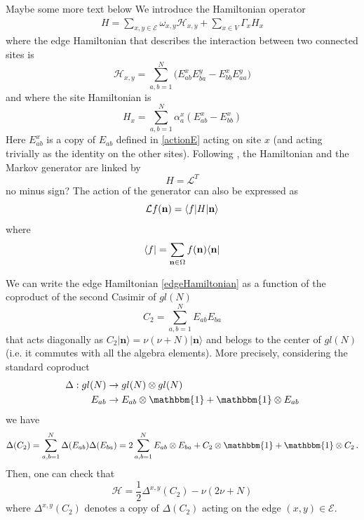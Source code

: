 \documentclass[10pt]{article}
\numberwithin{equation}{section}
\numberwithin{equation}{subsection}
\newcommand{\twoj}{\nu}
\begin{document}
{\color{red}Maybe some more text below}
We introduce the Hamiltonian operator
\begin{equation}\label{OriginalHamiltonian}
	\begin{split}
		H=\sum_{x,y\in \mathcal{E}}\omega_{x,y}\mathcal{H}_{x,y}+\sum_{x\in V}\Gamma_{x}H_{x}
	\end{split}
\end{equation}
where the edge Hamiltonian that describes the interaction between two connected sites is
\begin{equation}\label{edgeHamiltonian}
\mathcal{H}_{x,y}=\sum_{a,b=1}^{N}\Big(E_{ab}^{x} E_{b a}^{y}-E_{bb}^{x} E_{aa}^{y}\Big)
 \end{equation}
  and where the site Hamiltonian is
 \begin{equation}\label{siteHamiltonian}
H_{x}=\sum_{a,b=1}^{N}\alpha_{a}^{x}\left(E_{ab}^{x}-E_{bb}^{x}\right)
\end{equation}
Here $E_{ab}^{x}$ is a copy of $E_{ab}$ defined in \eqref{actionE} acting on site $x$ (and
acting trivially as the identity on the other sites). 
Following  \cite{belitsky2015self}, the Hamiltonian and the Markov generator are linked by
\begin{equation}\label{Hamiltonian-Generator}
H=\mathcal{L}^{T}
\end{equation}
{\color{red} no minus sign?}
The action of the generator can also be expressed as 
\begin{equation}
    \mathcal{L}f( {\bf n})=\langle f|H| {\bf n}\rangle
\end{equation}
where 
\begin{equation}
    \langle f|=\sum_{ {{\bf n}\in \Omega}}f( {\bf n})\langle  {\bf n}|
\end{equation}

We can write the edge Hamiltonian \eqref{edgeHamiltonian} as a function of the coproduct of the second Casimir of $gl(N)$
\begin{equation}\label{secondCasimir}
    C_{2}=\sum_{a,b=1}^{N}E_{ab}E_{ba}
\end{equation}
that acts diagonally as $C_{2}|\bm{n}\rangle=\twoj(\twoj+N)|\bm{n}\rangle$ and belogs to the center of $gl(N)$ (i.e. it commutes with all the algebra elements).  
More precisely,  considering the standard coproduct 
\begin{equation}
\begin{split}
\Delta:gl(N)&\to gl(N)\otimes gl(N)\\
E_{ab}&\to E_{ab}\otimes \mathbbm{1}+\mathbbm{1}\otimes E_{ab}
\end{split}
\end{equation}
we have 
\begin{equation}
\Delta(C_{2})=\sum_{a,b=1}^{N}\Delta(E_{ab})\Delta(E_{ba})=2\sum_{a,b=1}^{N}E_{ab}\otimes E_{ba}+C_{2}\otimes \mathbbm{1}+\mathbbm{1}\otimes C_{2}\,.
\end{equation}
Then, one can check that 
\begin{equation}\label{hamiltonianCasimir}
	\mathcal{H}=\frac{1}{2}\Delta^{x,y}(C_{2})-\twoj(2\twoj+N)
\end{equation}
where $\Delta^{x,y}(C_2)$ denotes a {\color{blue}copy} of $\Delta(C_2)$ acting on  
the edge $(x,y)\in \mathcal{E}$.
\end{document}
